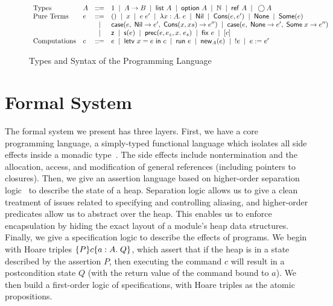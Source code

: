 \documentclass[preprint,natbib]{sigplanconf}
\begin{document}
\begin{figure*}
\renewcommand{\baselinestretch}{0.9}
\begin{displaymath}
\begin{array}{llcl}  
\mbox{Types} & A & ::= & 1 \;\;|\;\; A \to B \;\;|\;\; \mbox{\textsf{{list }}}{A} \;\;|\;\; \mbox{\textsf{{option }}}{A} \;\;|\;\;  \mathbb{N} \;\;|\;\; \mbox{\textsf{{ref }}}A \;\;|\;\; \bigcirc{A}\\ 

\mbox{Pure Terms} 
& e & ::= & () \;\;|\;\; x \;\;|\;\; e\;e' \;\;|\;\; \lambda x:A.\;e \;\;|\;\;
            \mbox{\textsf{{Nil}}} \;\;|\;\; \mbox{\textsf{{Cons}}}(e,e') \;\;|\;\; 
            \mbox{\textsf{{None}}} \;\;|\;\; \mbox{\textsf{{Some}}}(e) \\
&   & |   & \mbox{\textsf{{case}}}(e,\;\mbox{\textsf{{Nil}}} \to {e'},\; \mbox{\textsf{{Cons}}}({x},{xs}) \to {e''}) \;\;|\;\;
            \mbox{\textsf{{case}}}(e,\; \mbox{\textsf{{None}}} \to {e'},\; \mbox{\textsf{{Some}}}\;{x} \to {e''})\\ 
&   & |   & \mbox{\textsf{{z}}} \;\;|\;\; \mbox{\textsf{{s}}}(e) \;\;|\;\; \mbox{\textsf{{prec}}}(e, {e_z}, x.\; {e_s}) \;\;|\;\;
            \mbox{\textsf{{fix}}}_{}\;{e} \;\;|\;\; [c] \\
\mbox{Computations} 
& c & ::= & e \;\;|\;\; \mbox{\textsf{{letv }}}x = e\mbox{\textsf{{ in }}}c \;\;|\;\; \mbox{\textsf{{run }}}{e}  \;\;|\;\;
            \mbox{\textsf{{new}}}_{A} (e)\;\;|\;\; !e \;\;|\;\; e := e' \\
\end{array}
\end{displaymath}
\caption{Types and Syntax of the Programming Language}
\label{lang-syntax}
\renewcommand{\baselinestretch}{0.95}
\end{figure*}

\section{Formal System}

The formal system we present has three layers. First, we have a core
programming language, a simply-typed functional language which
isolates all side effects inside a monadic
type~\cite{pfenning-davies}. The side effects include nontermination
and the allocation, access, and modification of general references
(including pointers to closures).  Then, we give an assertion language
based on higher-order separation logic~\cite{hosl} to describe the
state of a heap. Separation logic allows us to give a clean treatment
of issues related to specifying and controlling aliasing, and
higher-order predicates allow us to abstract over the heap. This
enables us to enforce encapsulation by hiding the exact layout of a
module's heap data structures.  Finally, we give a specification logic
to describe the effects of programs. We begin with Hoare triples
$\{{P}\}{c}\{{a:A}.\;{Q}\}$, which assert that if the heap is in a state
described by the assertion $P$, then executing the command $c$ will
result in a postcondition state $Q$ (with the return value of the
command bound to $a$). We then build a first-order logic of
specifications, with Hoare triples as the atomic propositions.
\end{document}
